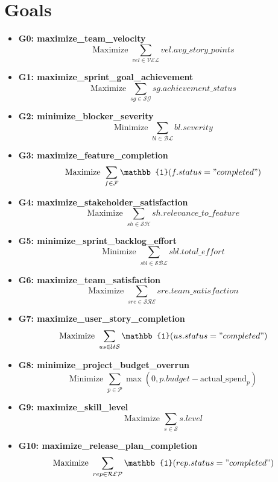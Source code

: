 \documentclass{article}
\begin{document}
\section{Goals}
\begin{itemize}
    \item \textbf{G0: maximize\_team\_velocity}
    \[
    \text{Maximize } \sum_{vel \in \mathcal{VEL}} vel.avg\_story\_points
    \]
    \item \textbf{G1: maximize\_sprint\_goal\_achievement}
    \[
    \text{Maximize } \sum_{sg \in \mathcal{SG}} sg.achievement\_status
    \]
    \item \textbf{G2: minimize\_blocker\_severity}
    \[
    \text{Minimize } \sum_{bl \in \mathcal{BL}} bl.severity
    \]
    \item \textbf{G3: maximize\_feature\_completion}
    \[
    \text{Maximize } \sum_{f \in \mathcal{F}} \mathbb{1}(f.status = "completed")
    \]
    \item \textbf{G4: maximize\_stakeholder\_satisfaction}
    \[
    \text{Maximize } \sum_{sh \in \mathcal{SH}} sh.relevance\_to\_feature
    \]
    \item \textbf{G5: minimize\_sprint\_backlog\_effort}
    \[
    \text{Minimize } \sum_{sbl \in \mathcal{SBL}} sbl.total\_effort
    \]
    \item \textbf{G6: maximize\_team\_satisfaction}
    \[
    \text{Maximize } \sum_{sre \in \mathcal{SRE}} sre.team\_satisfaction
    \]
    \item \textbf{G7: maximize\_user\_story\_completion}
    \[
    \text{Maximize } \sum_{us \in \mathcal{US}} \mathbb{1}(us.status = "completed")
    \]
    \item \textbf{G8: minimize\_project\_budget\_overrun}
    \[
    \text{Minimize } \sum_{p \in \mathcal{P}} \max(0, p.budget - \text{actual\_spend}_p)
    \]
    \item \textbf{G9: maximize\_skill\_level}
    \[
    \text{Maximize } \sum_{s \in \mathcal{S}} s.level
    \]
    \item \textbf{G10: maximize\_release\_plan\_completion}
    \[
    \text{Maximize } \sum_{rep \in \mathcal{REP}} \mathbb{1}(rep.status = "completed")
    \]
\end{itemize}
\end{document}
